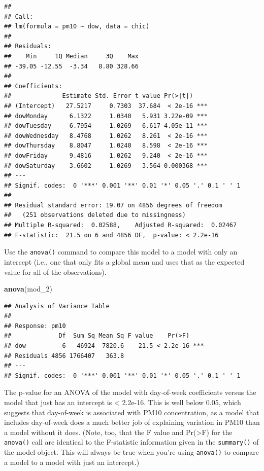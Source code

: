 \documentclass[]{book}
\makeatletter
\newenvironment{Shaded}{\begin{snugshade}}{\end{snugshade}}
\newcommand{\KeywordTok}[1]{\textcolor[rgb]{0.13,0.29,0.53}{\textbf{{#1}}}}
\newcommand{\NormalTok}[1]{{#1}}
\newenvironment{kframe}{%
\medskip{}
\setlength{\fboxsep}{.8em}
 \def\at@end@of@kframe{}%
 \ifinner\ifhmode%
  \def\at@end@of@kframe{\end{minipage}}%
  \begin{minipage}{\columnwidth}%
 \fi\fi%
 \def\FrameCommand##1{\hskip\@totalleftmargin \hskip-\fboxsep
 \colorbox{shadecolor}{##1}\hskip-\fboxsep
     \hskip-\linewidth \hskip-\@totalleftmargin \hskip\columnwidth}%
 \MakeFramed {\advance\hsize-\width
   \@totalleftmargin\z@ \linewidth\hsize
   \@setminipage}}%
 {\par\unskip\endMakeFramed%
 \at@end@of@kframe}
\renewenvironment{Shaded}{\begin{kframe}}{\end{kframe}}
\makeatother
\begin{document}
\begin{verbatim}
## 
## Call:
## lm(formula = pm10 ~ dow, data = chic)
## 
## Residuals:
##    Min     1Q Median     3Q    Max 
## -39.05 -12.55  -3.34   8.80 328.66 
## 
## Coefficients:
##              Estimate Std. Error t value Pr(>|t|)    
## (Intercept)   27.5217     0.7303  37.684  < 2e-16 ***
## dowMonday      6.1322     1.0340   5.931 3.22e-09 ***
## dowTuesday     6.7954     1.0269   6.617 4.05e-11 ***
## dowWednesday   8.4768     1.0262   8.261  < 2e-16 ***
## dowThursday    8.8047     1.0240   8.598  < 2e-16 ***
## dowFriday      9.4816     1.0262   9.240  < 2e-16 ***
## dowSaturday    3.6602     1.0269   3.564 0.000368 ***
## ---
## Signif. codes:  0 '***' 0.001 '**' 0.01 '*' 0.05 '.' 0.1 ' ' 1
## 
## Residual standard error: 19.07 on 4856 degrees of freedom
##   (251 observations deleted due to missingness)
## Multiple R-squared:  0.02588,    Adjusted R-squared:  0.02467 
## F-statistic:  21.5 on 6 and 4856 DF,  p-value: < 2.2e-16
\end{verbatim}

Use the \texttt{anova()} command to compare this model to a model with
only an intercept (i.e., one that only fits a global mean and uses that
as the expected value for all of the observations).

\begin{Shaded}
\begin{Highlighting}[]
\KeywordTok{anova}\NormalTok{(mod_2)}
\end{Highlighting}
\end{Shaded}

\begin{verbatim}
## Analysis of Variance Table
## 
## Response: pm10
##             Df  Sum Sq Mean Sq F value    Pr(>F)    
## dow          6   46924  7820.6    21.5 < 2.2e-16 ***
## Residuals 4856 1766407   363.8                      
## ---
## Signif. codes:  0 '***' 0.001 '**' 0.01 '*' 0.05 '.' 0.1 ' ' 1
\end{verbatim}

The p-value for an ANOVA of the model with day-of-week coefficients
versus the model that just has an intercept is \textless{} 2.2e-16. This
is well below 0.05, which suggests that day-of-week is associated with
PM10 concentration, as a model that includes day-of-week does a much
better job of explaining variation in PM10 than a model without it does.
(Note, too, that the F value and Pr(\textgreater{}F) for the
\texttt{anova()} call are identical to the F-statistic information given
in the \texttt{summary()} of the model object. This will always be true
when you're using \texttt{anova()} to compare a model to a model with
just an intercept.)
\end{document}
